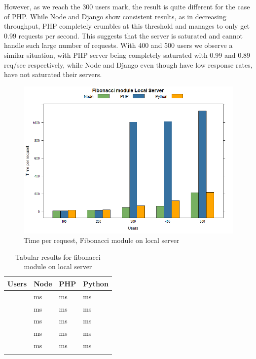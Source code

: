 \documentclass[../thesis.tex]{subfiles}
\begin{document}
However, as we reach the 300 users mark, the result is quite different for the case of PHP. While Node and Django show consistent results, as in decreasing throughput, PHP completely crumbles at this threshold and manages to only get 0.99 requests per second. This suggests that the server is saturated and cannot handle such large number of requests.
With 400 and 500 users we observe a similar situation, with PHP server being completely saturated with 0.99 and 0.89 req/sec respectively, while Node and Django even though have low response rates, have not saturated their servers.
\newpage
\begin{figure}[H]
	\centering
	\includegraphics[width=1\textwidth]{../images/fibLocaltpr.png}
	\caption{Time per request, Fibonacci module on local server}
	\label{rys1}
\end{figure}
\begin{table}[H]
	\caption{Tabular results for fibonacci module on local server}
	\centering
	\footnotesize
	\label{tab1}
	\bigskip
	\begin{tabular}{!{\color{sapphire}\vrule width 1pt}m{0.22\textwidth}!{\color{black}\vrule width 1pt}m{0.22\textwidth}!{\color{black}\vrule width 1pt}m{0.22\textwidth}!{\color{black}\vrule width 1pt}m{0.22\textwidth}!{\color{sapphire}\vrule width 1pt}}
		\hline
		\Centering \textbf{Users} &
		\Centering \textbf{Node} &
		\Centering \textbf{PHP} &
		\Centering \textbf{Python} \\
		\hline
		 &
		 ms &
		 ms&
		 ms\\
		\hline
		 &
		 ms&
		 ms&
		 ms\\
		\hline
		 &
		 ms&
		 ms&
		 ms\\
		\hline
		 &
		 ms&
		 ms&
		 ms\\
		\hline
		 &
		 ms&
		 ms&
		 ms\\
		\hline
		\hline
	\end{tabular}
\end{table}
\end{document}
